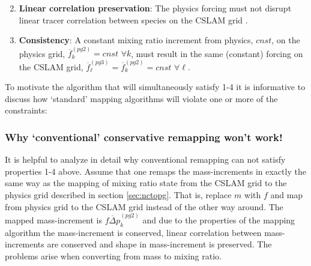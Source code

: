 \begin{enumerate}
\begin{equation}
\end{equation}
\item {\bf{Linear correlation preservation}}: The physics forcing must not disrupt linear tracer correlation between species on the CSLAM grid \citep[see, e.g., ][]{LT2011QJR}.
\item {\bf{Consistency}}: A constant mixing ratio increment from physics, $cnst$, on the physics grid, $\overline{f}_k^{(pg2)}=cnst$ $\forall k$, must result in the same (constant) forcing on the CSLAM grid, $\overline{f}_\ell^{(pg3)}=\overline{f}_k^{(pg2)}=cnst$ $\forall \ell$.
\end{enumerate}
To motivate the algorithm that will simultaneously satisfy 1-4 it is informative to discuss how `standard' mapping algorithms will violate one or more of the constraints:
\subsubsection{Why `conventional' conservative remapping won't work!}
It is helpful to analyze in detail why conventional remapping can not satisfy properties 1-4 above. Assume that one remaps the mass-increments in exactly the same way as the mapping of mixing ratio state from the CSLAM grid to the physics grid described in section \ref{sec:nctopg}. That is, replace $m$ with $f$ and map from physics grid to the CSLAM grid instead of the other way around. {\color{red}{explain algorithm with math ... need it for high-order preallocation!}} The mapped mass-increment is $\overline{f\Delta p}^{(pg2)}_k$ and due to the properties of the mapping algorithm the mass-increment is conserved, linear correlation between mass-increments are conserved and shape in mass-increment is preserved. The problems arise when converting from mass to mixing ratio.

